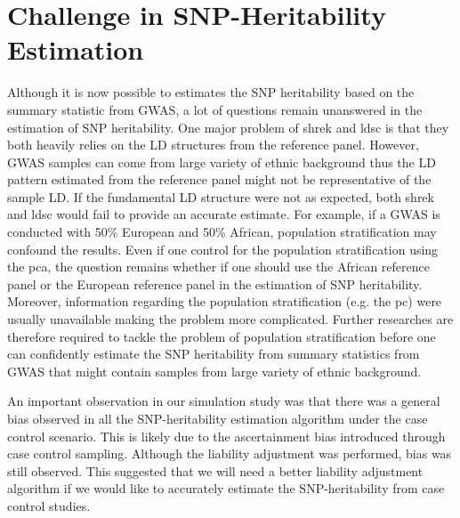 \documentclass[12pt]{scrbook}
\begin{document}
	\section{Challenge in SNP-Heritability Estimation}
	Although it is now possible to estimates the \gls{SNP} heritability based on the summary statistic from \gls{GWAS}, a lot of questions remain unanswered in the estimation of \gls{SNP} heritability.
	One major problem of \gls{shrek} and \gls{ldsc} is that they both heavily relies on the \gls{LD} structures from the reference panel.
	However, \gls{GWAS} samples can come from large variety of ethnic background thus the \gls{LD} pattern estimated from the reference panel might not be representative of the sample \gls{LD}.
	If the fundamental \gls{LD} structure were not as expected, both \gls{shrek} and \gls{ldsc} would fail to provide an accurate estimate. 
	For example, if a \gls{GWAS} is conducted with 50\% European and 50\% African, population stratification may confound the results.
	Even if one control for the population stratification using the \gls{pca}, the question remains whether if one should use the African reference panel or the European reference panel in the estimation of \gls{SNP} heritability.
	Moreover, information regarding the population stratification (e.g. the \gls{pc}) were usually unavailable making the problem more complicated.
	Further researches are therefore required to tackle the problem of population stratification before one can confidently estimate the \gls{SNP} heritability from summary statistics from \gls{GWAS} that might contain samples from large variety of ethnic background.
	
	An important observation in our simulation study was that there was a general bias observed in all the \gls{SNP}-heritability estimation algorithm under the case control scenario.
	This is likely due to the ascertainment bias introduced through case control sampling.
	Although the liability adjustment was performed, bias was still observed. 
	This suggested that we will need a better liability adjustment algorithm if we would like to accurately estimate the \gls{SNP}-heritability from case control studies.
	
\end{document}
